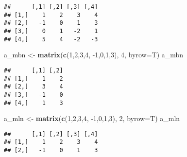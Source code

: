 \documentclass[]{article}
\newenvironment{Shaded}{\begin{snugshade}}{\end{snugshade}}
\newcommand{\DataTypeTok}[1]{\textcolor[rgb]{0.13,0.29,0.53}{#1}}
\newcommand{\DecValTok}[1]{\textcolor[rgb]{0.00,0.00,0.81}{#1}}
\newcommand{\KeywordTok}[1]{\textcolor[rgb]{0.13,0.29,0.53}{\textbf{#1}}}
\newcommand{\NormalTok}[1]{#1}
\newcommand{\StringTok}[1]{\textcolor[rgb]{0.31,0.60,0.02}{#1}}
\begin{document}
\begin{verbatim}
##      [,1] [,2] [,3] [,4]
## [1,]    1    2    3    4
## [2,]   -1    0    1    3
## [3,]    0    1   -2    1
## [4,]    5    4   -2   -3
\end{verbatim}

\begin{Shaded}
\begin{Highlighting}[]
\NormalTok{a_mbn <-}\StringTok{ }\KeywordTok{matrix}\NormalTok{(}\KeywordTok{c}\NormalTok{(}\DecValTok{1}\NormalTok{,}\DecValTok{2}\NormalTok{,}\DecValTok{3}\NormalTok{,}\DecValTok{4}\NormalTok{,}
              \DecValTok{-1}\NormalTok{,}\DecValTok{0}\NormalTok{,}\DecValTok{1}\NormalTok{,}\DecValTok{3}\NormalTok{), }\DecValTok{4}\NormalTok{, }\DataTypeTok{byrow=}\NormalTok{T)}
\NormalTok{a_mbn}
\end{Highlighting}
\end{Shaded}

\begin{verbatim}
##      [,1] [,2]
## [1,]    1    2
## [2,]    3    4
## [3,]   -1    0
## [4,]    1    3
\end{verbatim}

\begin{Shaded}
\begin{Highlighting}[]
\NormalTok{a_mln <-}\StringTok{ }\KeywordTok{matrix}\NormalTok{(}\KeywordTok{c}\NormalTok{(}\DecValTok{1}\NormalTok{,}\DecValTok{2}\NormalTok{,}\DecValTok{3}\NormalTok{,}\DecValTok{4}\NormalTok{,}
              \DecValTok{-1}\NormalTok{,}\DecValTok{0}\NormalTok{,}\DecValTok{1}\NormalTok{,}\DecValTok{3}\NormalTok{), }\DecValTok{2}\NormalTok{, }\DataTypeTok{byrow=}\NormalTok{T)}
\NormalTok{a_mln}
\end{Highlighting}
\end{Shaded}

\begin{verbatim}
##      [,1] [,2] [,3] [,4]
## [1,]    1    2    3    4
## [2,]   -1    0    1    3
\end{verbatim}
\end{document}
